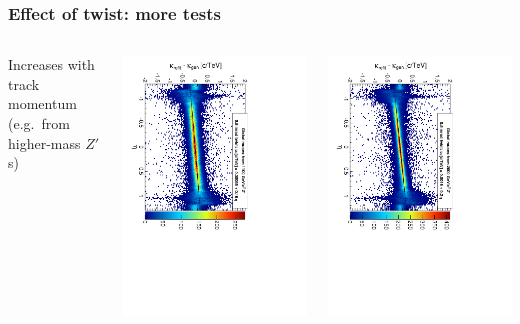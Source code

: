 \documentclass[compress]{beamer}
\begin{document}
\begin{frame}
\frametitle{Effect of twist: more tests}

\begin{columns}
Increases with track momentum (e.g.\ from higher-mass $Z'$s)

\includegraphics[height=\linewidth, angle=90]{curvbias_vseta_twist0_5mrad_1100_GlobalMuons2.pdf}

\includegraphics[height=\linewidth, angle=90]{curvbias_vseta_twist0_5mrad_2000_GlobalMuons2.pdf}


\end{columns}
\end{frame}
\end{document}
